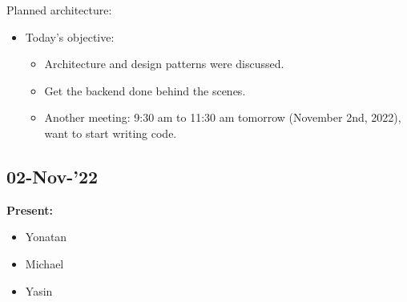\documentclass[11pt]{article}
\begin{document}
    \item    Planned architecture:
    \begin{itemize}
        \begin{itemize}
            \item repository style for the databases.
            \item Event-driven for reminders.
            \item Component-based.
        \end{itemize}
        \item Today's objective:
        \begin{itemize}
            \item Architecture and design patterns were discussed.
            \item Get the backend done behind the scenes.
            \item Another meeting: 9:30 am to 11:30 am tomorrow (November 2nd, 2022), want to start writing code.
        \end{itemize}
    \end{itemize}

    \subsection{02-Nov-’22}\label{subsec:02-nov-222}

    \textbf{Present:}
    \begin{itemize}
        \item Yonatan
        \item Michael
        \item Yasin
    \end{itemize}
\end{document}
